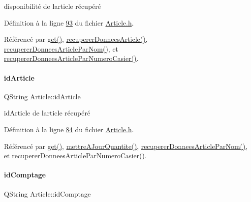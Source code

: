 disponibilité de l\textquotesingle{}article récupéré 



Définition à la ligne \hyperlink{_article_8h_source_l00093}{93} du fichier \hyperlink{_article_8h_source}{Article.\+h}.



Référencé par \hyperlink{_article_8cpp_source_l00266}{get()}, \hyperlink{_article_8cpp_source_l00050}{recuperer\+Donnees\+Article()}, \hyperlink{_article_8cpp_source_l00103}{recuperer\+Donnees\+Article\+Par\+Nom()}, et \hyperlink{_article_8cpp_source_l00156}{recuperer\+Donnees\+Article\+Par\+Numero\+Casier()}.

\mbox{\label{class_article_a9f2f7a04139f26accec145066a5aacae}} 
\paragraph{\texorpdfstring{id\+Article}{idArticle}}
{\footnotesize\ttfamily Q\+String Article\+::id\+Article\hspace{0.3cm}{\ttfamily [private]}}



id\+Article de l\textquotesingle{}article récupéré 



Définition à la ligne \hyperlink{_article_8h_source_l00084}{84} du fichier \hyperlink{_article_8h_source}{Article.\+h}.



Référencé par \hyperlink{_article_8cpp_source_l00266}{get()}, \hyperlink{_article_8cpp_source_l00329}{mettre\+A\+Jour\+Quantite()}, \hyperlink{_article_8cpp_source_l00103}{recuperer\+Donnees\+Article\+Par\+Nom()}, et \hyperlink{_article_8cpp_source_l00156}{recuperer\+Donnees\+Article\+Par\+Numero\+Casier()}.

\mbox{\label{class_article_adc8cef4c963c0fcc6d486dab4bd60e17}} 
\paragraph{\texorpdfstring{id\+Comptage}{idComptage}}
{\footnotesize\ttfamily Q\+String Article\+::id\+Comptage\hspace{0.3cm}{\ttfamily [private]}}



